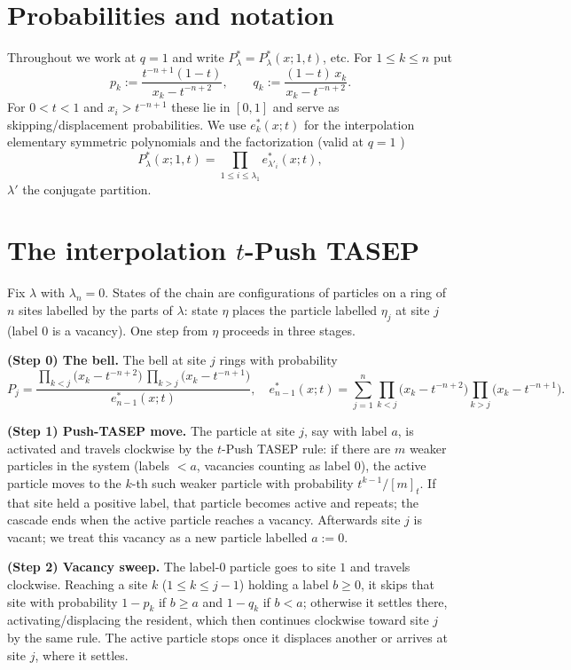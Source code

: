 \documentclass[11pt]{article}
\begin{document}
\section*{Probabilities and notation}

Throughout we work at $q=1$ and write $P^*_\lambda=P^*_\lambda(x;1,t)$, etc.
For $1\le k\le n$ put
\[
p_k:=\frac{t^{-n+1}(1-t)}{x_k-t^{-n+2}},\qquad
q_k:=\frac{(1-t)\,x_k}{x_k-t^{-n+2}} .
\]
For $0<t<1$ and $x_i>t^{-n+1}$ these lie in $[0,1]$ and serve as
skipping/displacement probabilities. We use $e^*_k(x;t)$ for the interpolation
elementary symmetric polynomials and the factorization (valid at $q=1$
\cite{Dolega,BDW25a})
\begin{equation}\label{eq:factor}
P^*_\lambda(x;1,t)=\prod_{1\le i\le\lambda_1}e^*_{\lambda'_i}(x;t),
\end{equation}
$\lambda'$ the conjugate partition.

\section*{The interpolation $t$-Push TASEP}

\begin{qthreedefinition}\label{def:chain}
Fix $\lambda$ with $\lambda_n=0$. States of the chain are configurations of
particles on a ring of $n$ sites labelled by the parts of $\lambda$: state $\eta$
places the particle labelled $\eta_j$ at site $j$ (label $0$ is a vacancy). One
step from $\eta$ proceeds in three stages.

\smallskip
\noindent\textbf{(Step 0) The bell.} The bell at site $j$ rings with probability
\[
P_j=\frac{\prod_{k<j}\bigl(x_k-t^{-n+2}\bigr)\,\prod_{k>j}\bigl(x_k-t^{-n+1}\bigr)}
{e^*_{n-1}(x;t)},
\quad
e^*_{n-1}(x;t)=\sum_{j=1}^n\prod_{k<j}\bigl(x_k-t^{-n+2}\bigr)\prod_{k>j}\bigl(x_k-t^{-n+1}\bigr).
\]

\smallskip
\noindent\textbf{(Step 1) Push-TASEP move.} The particle at site $j$, say with
label $a$, is activated and travels clockwise by the $t$-Push TASEP rule: if
there are $m$ weaker particles in the system (labels $<a$, vacancies counting as
label $0$), the active particle moves to the $k$-th such weaker particle with
probability $t^{k-1}/[m]_t$. If that site held a positive label, that particle
becomes active and repeats; the cascade ends when the active particle reaches a
vacancy. Afterwards site $j$ is vacant; we treat this vacancy as a new particle
labelled $a:=0$.

\smallskip
\noindent\textbf{(Step 2) Vacancy sweep.} The label-$0$ particle goes to site $1$
and travels clockwise. Reaching a site $k$ ($1\le k\le j-1$) holding a label
$b\ge0$, it skips that site with probability $1-p_k$ if $b\ge a$ and $1-q_k$ if
$b<a$; otherwise it settles there, activating/displacing the resident, which then
continues clockwise toward site $j$ by the same rule. The active particle stops
once it displaces another or arrives at site $j$, where it settles.
\end{qthreedefinition}
\end{document}
